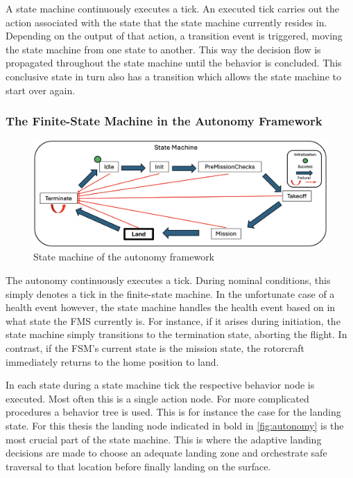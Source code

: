 A state machine continuously executes a tick. An executed tick carries out the action associated with the state that the state machine currently resides in. Depending on the output of that action, a transition event is triggered, moving the state machine from one state to another. This way the decision flow is propagated throughout the state machine until the behavior is concluded. This conclusive state in turn also has a transition which allows the state machine to start over again.

\subsubsection{The Finite-State Machine in the Autonomy Framework}

\begin{figure}[ht!]
    \centering
    \includegraphics[scale=0.17]{images/system_overview/state_machine.png}
    \caption{State machine of the autonomy framework}
    \label{fig:state_machine}
\end{figure}

The autonomy continuously executes a tick. During nominal conditions, this simply denotes a tick in the finite-state machine. In the unfortunate case of a health event however, the state machine handles the health event based on in what state the FMS currently is. For instance, if it arises during initiation, the state machine simply transitions to the termination state, aborting the flight. In contrast, if the FSM's current state is the mission state, the rotorcraft immediately returns to the home position to land.

In each state during a state machine tick the respective behavior node is executed. Most often this is a single action node. For more complicated procedures a behavior tree is used. This is for instance the case for the landing state. For this thesis the landing node indicated in bold in \cref{fig:autonomy} is the most crucial part of the state machine. This is where the adaptive landing decisions are made to choose an adequate landing zone and orchestrate safe traversal to that location before finally landing on the surface.

